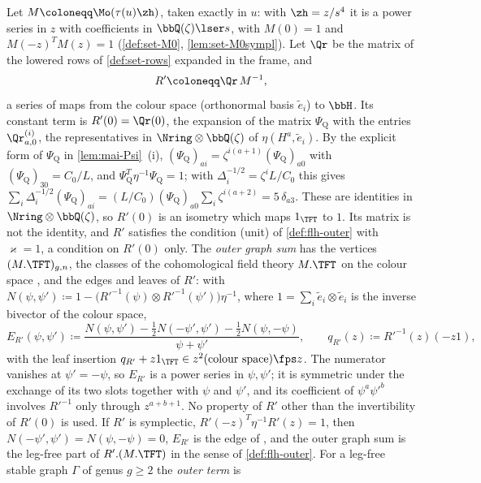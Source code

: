 \begin{defn}
\label{def:set-outer}
Let $M\coloneqq\Mo(\tau(u)\zh)$, taken exactly in $u$: with $\zh=z/s^4$ it is a power series in $z$ with coefficients in $\bbQ(\zeta)\lser s$, with $M(0)=1$ and $M(-z)^TM(z)=1$ (\cref{def:set-M0}, \cref{lem:set-M0sympl}). Let $\Qr$ be the matrix of the lowered rows of \cref{def:set-rows} expanded in the frame, and
\[
R'\coloneqq\Qr\,M^{-1},
\]
a series of maps from the colour space (orthonormal basis $\tilde e_i$) to $\bbH$. Its constant term is $R'(0)=\Qr(0)$, the expansion of the matrix $\Psi_{\mathrm Q}$ with the entries $\Qr^{(i)}_{a,0}$, the representatives in $\Nring\otimes\bbQ(\zeta)$ of $\eta(H^a,\tilde e_i)$. By the explicit form of $\Psi_{\mathrm Q}$ in \cref{lem:mai-Psi}~(i), $(\Psi_{\mathrm Q})_{ai}=\zeta^{i(a+1)}(\Psi_{\mathrm Q})_{a0}$ with $(\Psi_{\mathrm Q})_{30}=C_0/L$, and $\Psi_{\mathrm Q}^T\eta^{-1}\Psi_{\mathrm Q}=1$; with $\Delta_i^{-1/2}=\zeta^iL/C_0$ this gives $\sum_i\Delta_i^{-1/2}(\Psi_{\mathrm Q})_{ai}=(L/C_0)(\Psi_{\mathrm Q})_{a0}\sum_i\zeta^{i(a+2)}=5\,\delta_{a3}$. These are identities in $\Nring\otimes\bbQ(\zeta)$, so $R'(0)$ is an isometry which maps $1_{\TFT}$ to $1$. Its matrix is not the identity, and $R'$ satisfies the condition (unit) of \cref{def:flh-outer} with $\varkappa=1$, a condition on $R'(0)$ only. The \emph{outer graph sum} has the vertices $(M.\TFT)_{g,n}$, the classes of the cohomological field theory $M.\TFT$ on the colour space \cite[Def.~2.13]{PPZ15}, and the edges and leaves of $R'$: with $N(\psi,\psi')\coloneqq1-\bigl(R'^{-1}(\psi)\otimes R'^{-1}(\psi')\bigr)\eta^{-1}$, where $1=\sum_i\tilde e_i\otimes\tilde e_i$ is the inverse bivector of the colour space,
\[
E_{R'}(\psi,\psi')\coloneqq\frac{N(\psi,\psi')-\frac12N(-\psi',\psi')-\frac12N(\psi,-\psi)}{\psi+\psi'},\qquad q_{R'}(z)\coloneqq R'^{-1}(z)(-z1),
\]
with the leaf insertion $q_{R'}+z1_{\TFT}\in z^2(\text{colour space})\fps z$. The numerator vanishes at $\psi'=-\psi$, so $E_{R'}$ is a power series in $\psi,\psi'$; it is symmetric under the exchange of its two slots together with $\psi$ and $\psi'$, and its coefficient of $\psi^a\psi'^b$ involves $R'^{-1}$ only through $z^{a+b+1}$. No property of $R'$ other than the invertibility of $R'(0)$ is used. If $R'$ is symplectic, $R'(-z)^T\eta^{-1}R'(z)=1$, then $N(-\psi',\psi')=N(\psi,-\psi)=0$, $E_{R'}$ is the edge of \cite[Def.~2.2]{PPZ15} \cite[Rem.~2.1, (6)]{PPZ15}, and the outer graph sum is the leg-free part of $R'.(M.\TFT)$ in the sense of \cref{def:flh-outer}. For a leg-free stable graph $\Gamma$ of genus $g\geq2$ the \emph{outer term} is

\end{defn}
